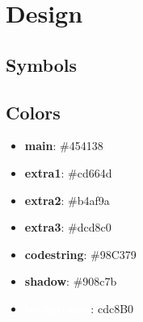 \section{Design}
\subsection{Symbols}

\nierarrow
\nierdiamond
{}


\subsection{Colors}

\begin{itemize}
    \item \textbf{\textcolor{main}{main}}: \#454138
    \item \textbf{\textcolor{extra1}{extra1}}: \#cd664d
    \item \textbf{\textcolor{extra2}{extra2}}: \#b4af9a
    \item \textbf{\textcolor{extra3}{extra3}}: \#dcd8c0
    \item \textbf{\textcolor{codestring}{codestring}}: \#98C379
    \item \textbf{\textcolor{shadow}{shadow}}: \#908c7b
    \item \textbf{\textcolor{background}{background}}: cdc8B0
\end{itemize}